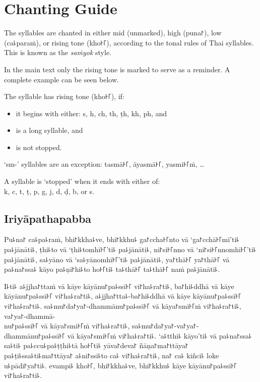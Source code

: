 \cleartorecto
\chapter{Chanting Guide}

The syllables are chanted in either mid (unmarked), high (puna꜓), low
(ca꜕paraṁ), or rising tone (kho꜔꜒), according to the tonal rules of Thai
syllables. This is known as the \emph{saṁyok} style.

In the main text only the rising tone is marked to serve as a reminder. A
complete example can be seen below.

The syllable has rising tone (kho꜔꜒), if:

\begin{itemize}[itemsep=0pt, parsep=0pt, topsep=0pt]
  \item it begins with either: s, h, ch, th, ṭh, kh, ph, and
  \item is a long syllable, and
  \item is not stopped.
\end{itemize}

`sm-' syllables are an exception: tasmā꜔꜒, āyasmā꜔꜒, yasmi꜔꜒ṁ, \ldots{}

A syllable is `stopped' when it ends with either of:\\
k, c, t, ṭ, p, g, j, d, ḍ, b, or s.

\enlargethispage{2\baselineskip}

\section*{Iriyāpathapabba}

Pu꜕na꜓ ca꜕pa꜕raṁ, bhi꜓kkha꜕ve, bhi꜓kkhu꜕ ga꜓ccha꜔꜒nto vā ‘ga꜓cchā꜔꜒mī’ti꜕ pa꜕jānāti꜕, ṭhi꜕to vā
‘ṭhi꜕tomhī꜔꜒’ti꜕ pa꜕jānāti꜕, ni꜓si꜔꜒nno vā ‘ni꜓si꜔꜒nnomhī꜔꜒’ti꜕ pa꜕jānāti꜕, sa꜕yāno vā
‘sa꜕yānomhī꜔꜒’ti꜕ pa꜕jānāti꜕, ya꜓thā꜔꜒ ya꜓thā꜔꜒ vā pa꜕na꜓ssa꜕ kāyo pa꜕ṇi꜓hi꜕to ho꜔꜒ti꜕ ta꜕thā꜔꜒ ta꜕thā꜔꜒
naṁ pa꜕jānāti꜕.

I꜕ti꜕ a꜕jjha꜓ttaṁ vā kāye kāyānu꜓pa꜕ssī꜔꜒ vi꜓ha꜕ra꜓ti꜕, ba꜓hi꜕ddhā vā kāye kāyānu꜓pa꜕ssī꜔꜒
vi꜓ha꜕ra꜓ti꜕, a꜕jjha꜓tta꜕-ba꜓hi꜕ddhā vā kāye kāyānu꜓pa꜕ssī꜔꜒ vi꜓ha꜕ra꜓ti꜕. sa꜕mu꜓da꜓ya꜓-dhammānu꜓pa꜕ssī꜔꜒
vā kāya꜓smi꜔꜒ṁ vi꜓ha꜕ra꜓ti꜕, va꜓ya꜓-dhammā-\\
nu꜓pa꜕ssī꜔꜒ vā kāya꜓smi꜔꜒ṁ vi꜓ha꜕ra꜓ti꜕, sa꜕mu꜓da꜓ya꜓-va꜓ya꜓-dhammānu꜓pa꜕ssī꜔꜒ vā kāya꜓smi꜔꜒ṁ vi꜓ha꜕ra꜓ti꜕.
‘a꜕tthi꜕ kāyo’ti꜕ vā pa꜕na꜓ssa꜕ sa꜕ti꜕ pa꜕ccu꜕pa꜕ṭṭhi꜕tā ho꜔꜒ti꜕ yāva꜓deva꜓ ñāṇa꜓ma꜓ttāya꜓
pa꜕ṭi꜕ssa꜕ti꜕ma꜓ttāya꜓ a꜕ni꜓ssi꜕to ca꜕ vi꜓ha꜕ra꜓ti꜕, na꜓ ca꜕ kiñci꜕ loke u꜕pādi꜓ya꜓ti꜕. evampi꜕ kho꜔꜒,
bhi꜓kkha꜕ve, bhi꜓kkhu꜕ kāye kāyānu꜓pa꜕ssī꜔꜒ vi꜓ha꜕ra꜓ti꜕.

